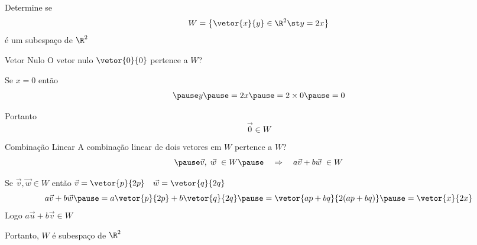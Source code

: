 \begin{question}
  Determine se
  \[
    W = \left\{ \vetor{x}{y} \in\R^{2} \st y = 2x \right\}
  \]
  é um subespaço de $\R^{2}$
\end{question}

\begin{resolution}{Vetor Nulo}
  O vetor nulo \(\vetor{0}{0}\) pertence a $W$?

  \pause
  Se $x=0$ então
  \[
    \pause
    y
    \pause
    = 2x
    \pause
    = 2\times 0
    \pause
    = 0
  \]

  \pause
  Portanto
  \[
    \vec{0} \in W
  \]

\end{resolution}
\begin{resolution}{Combinação Linear}
  A combinação linear de dois vetores em $W$ pertence a $W$?
  \[
    \pause
    \vec{v}, \; \vec{w} \; \in W
    \pause
    \quad\Rightarrow\quad
    a \vec{v} + b\vec{w} \; \in W
  \]

  \pause
  Se \(\vec{v}, \vec{w} \in W\)
  \pause
  então
  \(
    \vec{v} = \vetor{p}{2p}
    \quad
    \vec{w} = \vetor{q}{2q}
  \)
  \pause
  \[
    a\vec{v}+b\vec{w}
    \pause
    = a\vetor{p}{2p} + b\vetor{q}{2q}
    \pause
    = \vetor{ap+bq}{2(ap+bq)}
    \pause
    = \vetor{x}{2x}
  \]
   \pause
  Logo
  \(
    a\vec{u}+b\vec{v}\in W
  \)

  \pause
  Portanto, $W$ é subespaço de $\R^2$
\end{resolution}

\endinput
